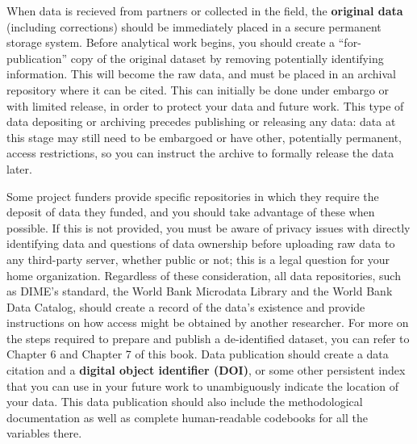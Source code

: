 When data is recieved from partners or collected in the field,
the \textbf{original data} (including corrections)
should be immediately placed in a secure permanent storage system.
Before analytical work begins, you should create a ``for-publication''
copy of the original dataset by removing potentially identifying information.
This will become the raw data, and must be
placed in an archival repository where it can be cited.
This can initially be done under embargo or with limited release,
in order to protect your data and future work.
This type of data depositing or archiving
precedes publishing or releasing any data:
data at this stage may still need to be embargoed
or have other, potentially permanent, access restrictions,
so you can instruct the archive to formally release the data later.

Some project funders
provide specific repositories in which they require the deposit of data they funded,
and you should take advantage of these when possible.
If this is not provided, you must be aware of privacy issues
with directly identifying data and questions of data ownership
before uploading raw data to any third-party server, whether public or not;
this is a legal question for your home organization.
Regardless of these consideration, all data repositories,
such as DIME's standard, the World Bank Microdata Library
and the World Bank Data Catalog,
should create a record of the data's existence
and provide instructions on how access might be obtained by another researcher.
For more on the steps required to prepare and publish a de-identified dataset,
you can refer to Chapter 6 and Chapter 7 of this book.
Data publication should create a data citation and a \textbf{digital object identifier (DOI)},
or some other persistent index that you can use in your future work
to unambiguously indicate the location of your data.
This data publication should also include the methodological documentation
as well as complete human-readable codebooks for all the variables there.


